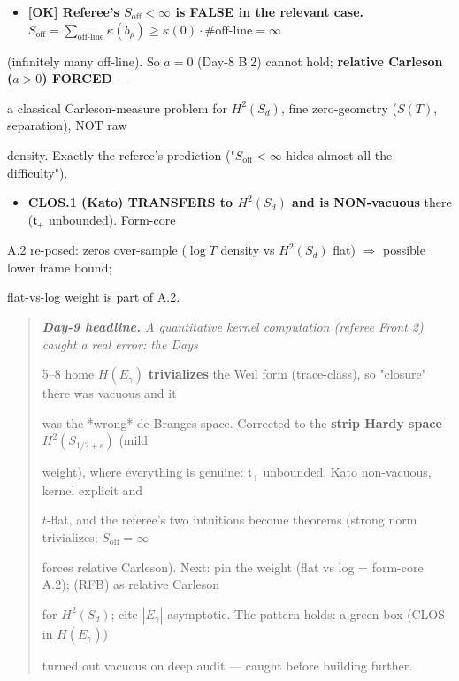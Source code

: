 \documentclass[10pt]{article}
\begin{document}
\begin{itemize}
\item \textbf{[OK] Referee's $S_{\mathrm{off}}<\infty$ is FALSE in the relevant case.} $S_{\mathrm{off}}=\sum_{\text{off-line}}\kappa(b_\rho)\ge\kappa(0)\cdot\#\text{off-line}=\infty$
\end{itemize}
  (infinitely many off-line). So $a=0$ (Day-8 B.2) cannot hold; \textbf{relative Carleson ($a>0$) FORCED} ---\par
  a classical Carleson-measure problem for $H^2(S_d)$, fine zero-geometry ($S(T)$, separation), NOT raw\par
  density. Exactly the referee's prediction ("$S_{\mathrm{off}}<\infty$ hides almost all the difficulty").\par
\begin{itemize}
\item \textbf{CLOS.1 (Kato) TRANSFERS to $H^2(S_d)$ and is NON-vacuous} there ($\mathfrak t_+$ unbounded). Form-core
\end{itemize}
  A.2 re-posed: zeros over-sample ($\log T$ density vs $H^2(S_d)$ flat) \ensuremath{\Rightarrow} possible lower frame bound;\par
  flat-vs-log weight is part of A.2.\par

\begin{quote}\itshape
\textbf{Day-9 headline.} A quantitative kernel computation (referee Front 2) caught a real error: the Days\par
5--8 home $H(E_\gamma)$ \textbf{trivializes} the Weil form (trace-class), so "closure" there was vacuous and it\par
was the *wrong* de Branges space. Corrected to the \textbf{strip Hardy space} $H^2(S_{1/2+\epsilon})$ (mild\par
weight), where everything is genuine: $\mathfrak t_+$ unbounded, Kato non-vacuous, kernel explicit and\par
$t$-flat, and the referee's two intuitions become theorems (strong norm trivializes; $S_{\mathrm{off}}=\infty$\par
forces relative Carleson). Next: pin the weight (flat vs log = form-core A.2); (RFB) as relative Carleson\par
for $H^2(S_d)$; cite $|E_\gamma|$ asymptotic. The pattern holds: a green box (CLOS in $H(E_\gamma)$)\par
turned out vacuous on deep audit --- caught before building further.\par
\end{quote}
\end{document}

